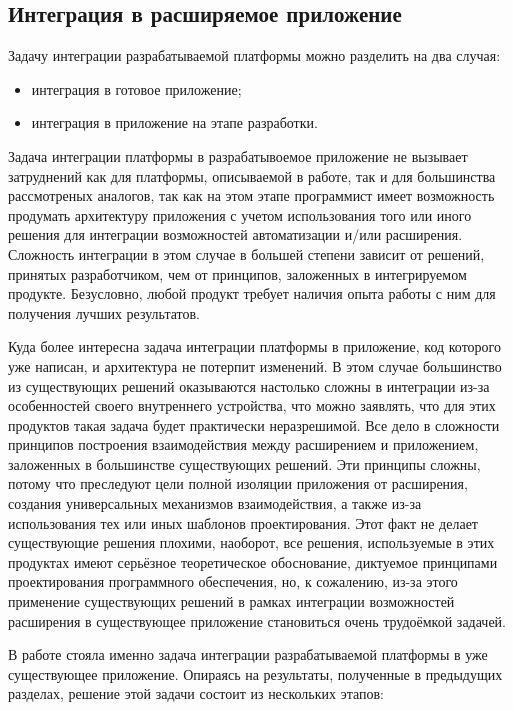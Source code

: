\subsection{Интеграция в расширяемое приложение}
\label{sec:app-integration}

Задачу интеграции разрабатываемой платформы можно разделить на два случая:

\begin{itemize}
  \item интеграция в готовое приложение;
  \item интеграция в приложение на этапе разработки.
\end{itemize}

Задача интеграции платформы в разрабатывоемое приложение не вызывает затруднений как для платформы, описываемой в работе, так и для большинства рассмотреных аналогов, так как на этом этапе программист имеет возможность продумать архитектуру приложения с учетом использования того или иного решения для интеграции возможностей автоматизации и/или расширения. Сложность интеграции в этом случае в большей степени зависит от решений, принятых разработчиком, чем от принципов, заложенных в интегрируемом продукте. Безусловно, любой продукт требует наличия опыта работы с ним для получения лучших результатов.

Куда более интересна задача интеграции платформы в приложение, код которого уже написан, и архитектура не потерпит изменений. В этом случае большинство из существующих решений оказываются настолько сложны в интеграции из-за особенностей своего внутреннего устройства, что можно заявлять, что для этих продуктов такая задача будет практически неразрешимой. Все дело в сложности принципов построения взаимодействия между расширением и приложением, заложенных в большинстве существующих решений. Эти принципы сложны, потому что преследуют цели полной изоляции приложения от расширения, создания универсальных механизмов взаимодействия, а также из-за использования тех или иных шаблонов проектирования. Этот факт не делает существующие решения плохими, наоборот, все решения, используемые в этих продуктах имеют серьёзное теоретическое обоснование, диктуемое принципами проектирования программного обеспечения, но, к сожалению, из-за этого применение существующих решений в рамках интеграции возможностей расширения в существующее приложение становиться очень трудоёмкой задачей.

В работе стояла именно задача интеграции разрабатываемой платформы в уже существующее приложение. Опираясь на результаты, полученные в предыдущих разделах, решение этой задачи состоит из нескольких этапов:

